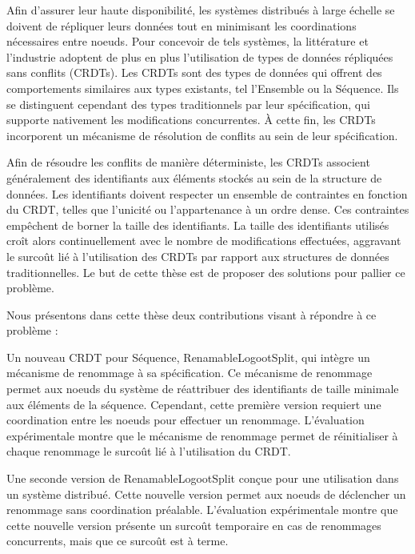 \documentclass[12pt]{thesul}
\theoremstyle{definition}
\begin{document}
\NumberAbstractPages
\begin{ThesisAbstract}
  \begin{FrenchAbstract}
    Afin d'assurer leur haute disponibilité, les systèmes distribués à large échelle se doivent de répliquer leurs données tout en minimisant les coordinations nécessaires entre noeuds.
    Pour concevoir de tels systèmes, la littérature et l'industrie adoptent de plus en plus l'utilisation de types de données répliquées sans conflits (CRDTs).
    Les CRDTs sont des types de données qui offrent des comportements similaires aux types existants, tel l'Ensemble ou la Séquence.
    Ils se distinguent cependant des types traditionnels par leur spécification, qui supporte nativement les modifications concurrentes.
    À cette fin, les CRDTs incorporent un mécanisme de résolution de conflits au sein de leur spécification.

    Afin de résoudre les conflits de manière déterministe, les CRDTs associent généralement des identifiants aux éléments stockés au sein de la structure de données.
    Les identifiants doivent respecter un ensemble de contraintes en fonction du CRDT, telles que l'unicité ou l'appartenance à un ordre dense.
    Ces contraintes empêchent de borner la taille des identifiants.
    La taille des identifiants utilisés croît alors continuellement avec le nombre de modifications effectuées, aggravant le surcoût lié à l'utilisation des CRDTs par rapport aux structures de données traditionnelles.
    Le but de cette thèse est de proposer des solutions pour pallier ce problème.

    Nous présentons dans cette thèse deux contributions visant à répondre à ce problème :
    \begin{enumerate*}
      \item Un nouveau CRDT pour Séquence, RenamableLogootSplit, qui intègre un mécanisme de renommage à sa spécification.
      Ce mécanisme de renommage permet aux noeuds du système de réattribuer des identifiants de taille minimale aux éléments de la séquence.
      Cependant, cette première version requiert une coordination entre les noeuds pour effectuer un renommage.
      L'évaluation expérimentale montre que le mécanisme de renommage permet de réinitialiser à chaque renommage le surcoût lié à l'utilisation du CRDT.
      \item Une seconde version de RenamableLogootSplit conçue pour une utilisation dans un système distribué.
      Cette nouvelle version permet aux noeuds de déclencher un renommage sans coordination préalable.
      L'évaluation expérimentale montre que cette nouvelle version présente un surcoût temporaire en cas de renommages concurrents, mais que ce surcoût est à terme.
    \end{enumerate*}
  \end{FrenchAbstract}
  \begin{EnglishAbstract}
  \end{EnglishAbstract}
\end{ThesisAbstract}
\end{document}
